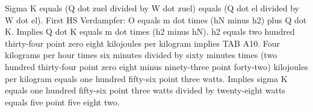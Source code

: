 Sigma K equals (Q dot zuel divided by W dot zuel) equals (Q dot el divided by W dot el). First HS Verdampfer: O equals m dot times (hN minus h2) plus Q dot K. Implies Q dot K equals m dot times (h2 minus hN). h2 equals two hundred thirty-four point zero eight kilojoules per kilogram implies TAB A10. Four kilograms per hour times six minutes divided by sixty minutes times (two hundred thirty-four point zero eight minus ninety-three point forty-two) kilojoules per kilogram equals one hundred fifty-six point three watts. Implies sigma K equals one hundred fifty-six point three watts divided by twenty-eight watts equals five point five eight two.